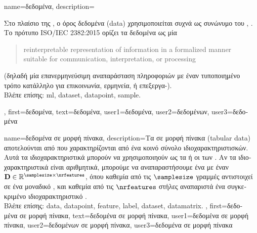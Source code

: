 {name={\foreignlanguage{greek}{δεδομένα}},
	 description={\foreignlanguage{greek}{Στο πλαίσιο της} , \foreignlanguage{greek}{ο όρος δεδομένα}  
 		(data) \foreignlanguage{greek}{χρησιμοποιείται συχνά ως συνώνυμο του}
		 \cite{Everitt2010}, \cite{OxfordStatisticsDictionary}. 
  		\foreignlanguage{greek}{Το πρότυπο} ISO/IEC 2382:2015 \cite{ISO2382} \foreignlanguage{greek}{ορίζει τα δεδομένα ως μία}
		\begin{quote} reinterpretable representation of information in a formalized manner suitable for communication, interpretation, 
  		or processing \end{quote}
		\foreignlanguage{greek}{(δηλαδή μία} \foreignlanguage{greek}{\guillemotleft επανερμηνεύσιμη αναπαράσταση πληροφοριών 
		με έναν τυποποιημένο τρόπο κατάλληλο για επικοινωνία, ερμηνεία, ή επεξεργα-\guillemotright)}.
		\\
		\foreignlanguage{greek}{Βλέπε επίσης:} \gls{ml}, \gls{dataset}, \gls{datapoint}, \gls{sample}.}, 
	first={\foreignlanguage{greek}{δεδομένα}},
	text={\foreignlanguage{greek}{δεδομένα}},
	user1={\foreignlanguage{greek}{δεδομένα}}, %
  	user2={\foreignlanguage{greek}{δεδομένων}}, %
	user3={\foreignlanguage{greek}{δεδομένα}} %
}

{name={\foreignlanguage{greek}{δεδομένα σε μορφή πίνακα}},
	description={\foreignlanguage{greek}{Τα}  
		\foreignlanguage{greek}{σε μορφή πίνακα} (tabular data) \foreignlanguage{greek}{αποτελούνται από}  
		\foreignlanguage{greek}{που χαρακτηρίζονται από ένα κοινό σύνολο ιδιοχαρακτηριστισκών. Αυτά τα ιδιοχαρακτηριστικά  
		μπορούν να χρησιμοποιηούν ως τα}  \foreignlanguage{greek}{ή οι}  \foreignlanguage{greek}{των} 
		. \foreignlanguage{greek}{Αν τα ιδιοχαρακτηριστικά είναι αριθμητικά, μπορούμε να αναπαραστήσουμε ένα}
		 \foreignlanguage{greek}{με έναν}  $\mathbf{D} \in \mathbb{R}^{\samplesize \times \nrfeatures}$, 
		\foreignlanguage{greek}{όπου καθεμία από τις $\samplesize$ γραμμές αντιστοιχεί σε ένα μοναδικό} ,
		\foreignlanguage{greek}{και καθεμία από τις $\nrfeatures$ στήλες αναπαριστά ένα συγκεκριμένο ιδιοχαρακτηριστικό} \cite{Everitt2022}.
		\\
		\foreignlanguage{greek}{Βλέπε επίσης:} \gls{data}, \gls{datapoint}, \gls{feature}, \gls{label}, \gls{dataset}, \gls{datamatrix}. }, 
	first={\foreignlanguage{greek}{δεδομένα σε μορφή πίνακα}},
	text={\foreignlanguage{greek}{δεδομένα σε μορφή πίνακα}},
	user1={\foreignlanguage{greek}{δεδομένα σε μορφή πίνακα}}, %
  	user2={\foreignlanguage{greek}{δεδομένων σε μορφή πίνακα}}, %
	user3={\foreignlanguage{greek}{δεδομένα σε μορφή πίνακα}} %
}

